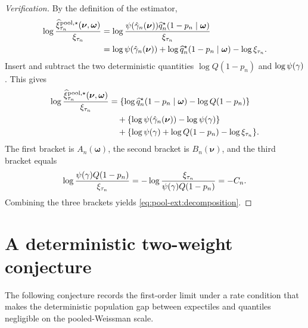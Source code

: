 \begin{proof}[Verification]
By the definition of the estimator,
\[
\begin{aligned}
  \log
  \frac{
    \widehat\xi_{\tau_n}^{\mathrm{pool},\star}(\bm\nu,\bm\omega)
  }{\xi_{\tau_n}}
  &=
  \log
  \frac{
    \psi(\hat\gamma_n(\bm\nu))
    \widehat{q}^{\star}_n(1-p_n\mid\bm\omega)
  }{\xi_{\tau_n}}  \\
  &=
  \log\psi(\hat\gamma_n(\bm\nu))
  +
  \log\widehat{q}^{\star}_n(1-p_n\mid\bm\omega)
  -
  \log\xi_{\tau_n}.
\end{aligned}
\]
Insert and subtract the two deterministic quantities
\(\log Q(1-p_n)\) and \(\log\psi(\gamma)\). This gives
\[
\begin{aligned}
  \log
  \frac{
    \widehat\xi_{\tau_n}^{\mathrm{pool},\star}(\bm\nu,\bm\omega)
  }{\xi_{\tau_n}}
  &=
  \{\log\widehat{q}^{\star}_n(1-p_n\mid\bm\omega)-\log Q(1-p_n)\}  \\
  &\quad
  +
  \{\log\psi(\hat\gamma_n(\bm\nu))-\log\psi(\gamma)\}  \\
  &\quad
  +
  \{\log\psi(\gamma)+\log Q(1-p_n)-\log\xi_{\tau_n}\}.
\end{aligned}
\]
The first bracket is \(A_n(\bm\omega)\), the second bracket is
\(B_n(\bm\nu)\), and the third bracket equals
\[
  \log
  \frac{\psi(\gamma)Q(1-p_n)}{\xi_{\tau_n}}
  =
  -\log
  \frac{\xi_{\tau_n}}{\psi(\gamma)Q(1-p_n)}
  =
  -C_n.
\]
Combining the three brackets yields \eqref{eq:pool-ext:decomposition}.
\end{proof}

\section{A deterministic two-weight conjecture}
\label{sec:pool-ext:deterministic}

The following conjecture records the first-order limit under a rate condition that
makes the deterministic population gap between expectiles and quantiles
negligible on the pooled-Weissman scale.

